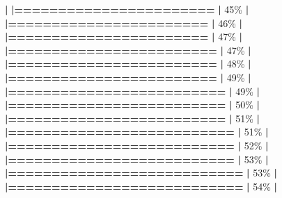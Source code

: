 \documentclass[
]{book}
\newenvironment{Shaded}{\begin{snugshade}}{\end{snugshade}}
\newcommand{\DecValTok}[1]{\textcolor[rgb]{0.00,0.00,0.81}{#1}}
\newcommand{\ErrorTok}[1]{\textcolor[rgb]{0.64,0.00,0.00}{\textbf{#1}}}
\newcommand{\NormalTok}[1]{#1}
\newcommand{\SpecialCharTok}[1]{\textcolor[rgb]{0.81,0.36,0.00}{\textbf{#1}}}
\begin{document}
\begin{Shaded}
\begin{Highlighting}[]
  \SpecialCharTok{|}                                                        
  \ErrorTok{|=======================}                           \ErrorTok{|}  \DecValTok{45}\NormalTok{\%}
  \SpecialCharTok{|}                                                        
  \ErrorTok{|=======================}                           \ErrorTok{|}  \DecValTok{46}\NormalTok{\%}
  \SpecialCharTok{|}                                                        
  \ErrorTok{|=======================}                           \ErrorTok{|}  \DecValTok{47}\NormalTok{\%}
  \SpecialCharTok{|}                                                        
  \ErrorTok{|========================}                          \ErrorTok{|}  \DecValTok{47}\NormalTok{\%}
  \SpecialCharTok{|}                                                        
  \ErrorTok{|========================}                          \ErrorTok{|}  \DecValTok{48}\NormalTok{\%}
  \SpecialCharTok{|}                                                        
  \ErrorTok{|========================}                          \ErrorTok{|}  \DecValTok{49}\NormalTok{\%}
  \SpecialCharTok{|}                                                        
  \ErrorTok{|=========================}                         \ErrorTok{|}  \DecValTok{49}\NormalTok{\%}
  \SpecialCharTok{|}                                                        
  \ErrorTok{|=========================}                         \ErrorTok{|}  \DecValTok{50}\NormalTok{\%}
  \SpecialCharTok{|}                                                        
  \ErrorTok{|=========================}                         \ErrorTok{|}  \DecValTok{51}\NormalTok{\%}
  \SpecialCharTok{|}                                                        
  \ErrorTok{|==========================}                        \ErrorTok{|}  \DecValTok{51}\NormalTok{\%}
  \SpecialCharTok{|}                                                        
  \ErrorTok{|==========================}                        \ErrorTok{|}  \DecValTok{52}\NormalTok{\%}
  \SpecialCharTok{|}                                                        
  \ErrorTok{|==========================}                        \ErrorTok{|}  \DecValTok{53}\NormalTok{\%}
  \SpecialCharTok{|}                                                        
  \ErrorTok{|===========================}                       \ErrorTok{|}  \DecValTok{53}\NormalTok{\%}
  \SpecialCharTok{|}                                                        
  \ErrorTok{|===========================}                       \ErrorTok{|}  \DecValTok{54}\NormalTok{\%}
  \SpecialCharTok{|}                                                        

\end{Highlighting}
\end{Shaded}
\end{document}
